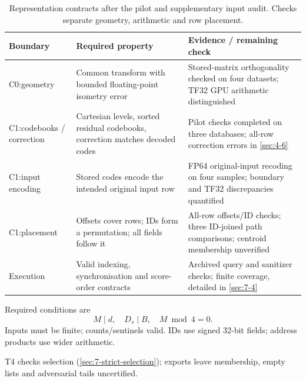 \begin{table}[tbp]
\centering
\caption[Representation contracts and audit coverage]{Representation contracts after the pilot and supplementary input audit.
Checks separate geometry, arithmetic and row placement.}
\label{tab:4-contracts}
\footnotesize\setlength{\tabcolsep}{4pt}
\begin{tabularx}{\linewidth}{@{}>{\raggedright\arraybackslash}p{1.8cm}*{2}{>{\raggedright\arraybackslash}X}@{}}
\toprule
Boundary & Required property & Evidence / remaining check \\
\midrule
C0:\newline geometry & Common transform with bounded floating-point isometry error & Stored-matrix orthogonality checked on four datasets; TF32 GPU arithmetic distinguished \\
C1:\newline codebooks / correction & Cartesian levels, sorted residual codebooks, correction matches decoded codes & Pilot checks completed on three databases; all-row correction errors in \cref{sec:4-6} \\
C1:\newline input encoding & Stored codes encode the intended original input row & FP64 original-input recoding on four samples; boundary and TF32 discrepancies quantified \\
C1:\newline placement & Offsets cover rows; IDs form a permutation; all fields follow it & All-row offsets/ID checks; three ID-joined path comparisons; centroid membership unverified \\
Execution & Valid indexing, synchronisation and score-order contracts & Archived query and sanitizer checks; finite coverage, detailed in \cref{sec:7-4} \\
\bottomrule
\end{tabularx}
\end{table}

Required conditions are
\[
 M\mid d,\quad D_s\mid B,\quad M\bmod4=0.
\]
Inputs must be finite; counts/sentinels valid. IDs use signed 32-bit fields; address products use wider arithmetic.

T4 checks selection (\cref{sec:7-strict-selection}); exports leave membership, empty lists and adversarial tails uncertified.